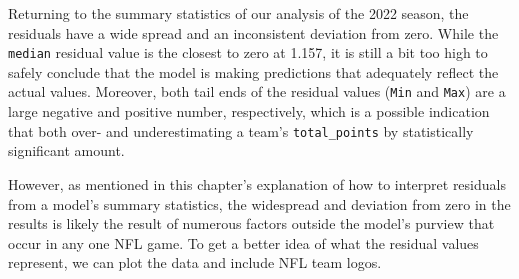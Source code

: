 \documentclass[
  letterpaper,
]{krantz}
\begin{document}
Returning to the summary statistics of our analysis of the 2022 season,
the residuals have a wide spread and an inconsistent deviation from
zero. While the \texttt{median} residual value is the closest to zero at
1.157, it is still a bit too high to safely conclude that the model is
making predictions that adequately reflect the actual values. Moreover,
both tail ends of the residual values (\texttt{Min} and \texttt{Max})
are a large negative and positive number, respectively, which is a
possible indication that both over- and underestimating a team's
\texttt{total\_points} by statistically significant amount.

However, as mentioned in this chapter's explanation of how to interpret
residuals from a model's summary statistics, the widespread and
deviation from zero in the results is likely the result of numerous
factors outside the model's purview that occur in any one NFL game. To
get a better idea of what the residual values represent, we can plot the
data and include NFL team logos.
\end{document}
